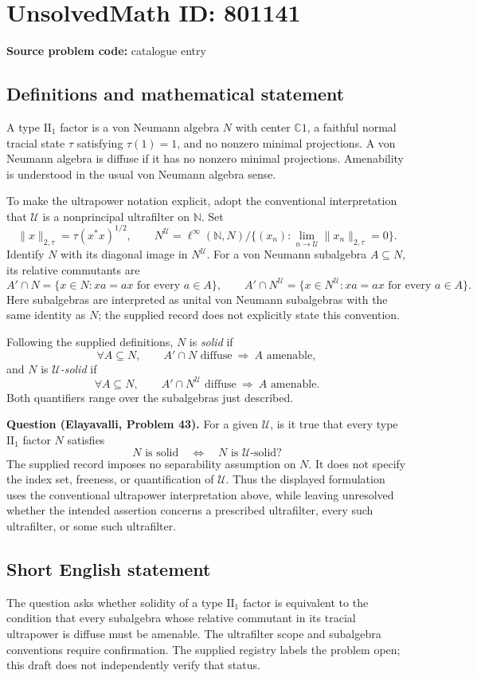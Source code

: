\documentclass[11pt]{article}
\newcommand{\N}{\mathbb{N}}
\newcommand{\C}{\mathbb{C}}
\begin{document}
\section*{UnsolvedMath ID: 801141}
\textbf{Source problem code:} catalogue entry
\subsection{Definitions and mathematical statement}
A type \(\mathrm{II}_1\) factor is a von Neumann algebra \(N\) with center \(\C 1\), a faithful normal tracial state \(\tau\) satisfying \(\tau(1)=1\), and no nonzero minimal projections. A von Neumann algebra is diffuse if it has no nonzero minimal projections. Amenability is understood in the usual von Neumann algebra sense.

To make the ultrapower notation explicit, adopt the conventional interpretation that \(\mathcal U\) is a nonprincipal ultrafilter on \(\N\). Set
\[
\|x\|_{2,\tau}=\tau(x^*x)^{1/2},\qquad
N^{\mathcal U}=\ell^\infty(\N,N)\big/\{(x_n):\lim_{n\to\mathcal U}\|x_n\|_{2,\tau}=0\}.
\]
Identify \(N\) with its diagonal image in \(N^{\mathcal U}\). For a von Neumann subalgebra \(A\subseteq N\), its relative commutants are
\[
A'\cap N=\{x\in N:xa=ax\text{ for every }a\in A\},
\qquad
A'\cap N^{\mathcal U}=\{x\in N^{\mathcal U}:xa=ax\text{ for every }a\in A\}.
\]
Here subalgebras are interpreted as unital von Neumann subalgebras with the same identity as \(N\); the supplied record does not explicitly state this convention.

Following the supplied definitions, \(N\) is \emph{solid} if
\[
\forall A\subseteq N,\qquad
A'\cap N\text{ diffuse}\ \Longrightarrow\ A\text{ amenable},
\]
and \(N\) is \emph{\(\mathcal U\)-solid} if
\[
\forall A\subseteq N,\qquad
A'\cap N^{\mathcal U}\text{ diffuse}\ \Longrightarrow\ A\text{ amenable}.
\]
Both quantifiers range over the subalgebras just described.

\textbf{Question (Elayavalli, Problem 43).} For a given \(\mathcal U\), is it true that every type \(\mathrm{II}_1\) factor \(N\) satisfies
\[
N\text{ is solid}\quad\Longleftrightarrow\quad N\text{ is }\mathcal U\text{-solid}?
\]
The supplied record imposes no separability assumption on \(N\). It does not specify the index set, freeness, or quantification of \(\mathcal U\). Thus the displayed formulation uses the conventional ultrapower interpretation above, while leaving unresolved whether the intended assertion concerns a prescribed ultrafilter, every such ultrafilter, or some such ultrafilter.
\subsection{Short English statement}
The question asks whether solidity of a type \(\mathrm{II}_1\) factor is equivalent to the condition that every subalgebra whose relative commutant in its tracial ultrapower is diffuse must be amenable. The ultrafilter scope and subalgebra conventions require confirmation. The supplied registry labels the problem open; this draft does not independently verify that status.
\end{document}
